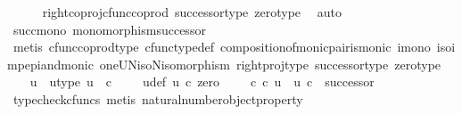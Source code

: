 \begin{isabellebody}
\ \ \ \ \isamarkupfalse%
\ right{\isacharunderscore}{\kern0pt}coproj{\isacharunderscore}{\kern0pt}cfunc{\isacharunderscore}{\kern0pt}coprod\ successor{\isacharunderscore}{\kern0pt}type\ zero{\isacharunderscore}{\kern0pt}type\ \isamarkupfalse%
\ auto\isanewline
\ \ \isamarkupfalse%
\ \isamarkupfalse%
\ succ{\isacharunderscore}{\kern0pt}mono{\isacharcolon}{\kern0pt}\ {\isachardoublequoteopen}monomorphism{\isacharparenleft}{\kern0pt}successor{\isacharparenright}{\kern0pt}{\isachardoublequoteclose}\isanewline
\ \ \ \ \isamarkupfalse%
\ {\isacharparenleft}{\kern0pt}metis\ cfunc{\isacharunderscore}{\kern0pt}coprod{\isacharunderscore}{\kern0pt}type\ cfunc{\isacharunderscore}{\kern0pt}type{\isacharunderscore}{\kern0pt}def\ composition{\isacharunderscore}{\kern0pt}of{\isacharunderscore}{\kern0pt}monic{\isacharunderscore}{\kern0pt}pair{\isacharunderscore}{\kern0pt}is{\isacharunderscore}{\kern0pt}monic\ i{}{\isacharunderscore}{\kern0pt}mono\ iso{\isacharunderscore}{\kern0pt}imp{\isacharunderscore}{\kern0pt}epi{\isacharunderscore}{\kern0pt}and{\isacharunderscore}{\kern0pt}monic\ oneUN{\isacharunderscore}{\kern0pt}iso{\isacharunderscore}{\kern0pt}N{\isacharunderscore}{\kern0pt}isomorphism\ right{\isacharunderscore}{\kern0pt}proj{\isacharunderscore}{\kern0pt}type\ successor{\isacharunderscore}{\kern0pt}type\ zero{\isacharunderscore}{\kern0pt}type{\isacharparenright}{\kern0pt}\isanewline
\ \ \isamarkupfalse%
\ u\ \ u{\isacharunderscore}{\kern0pt}type{\isacharcolon}{\kern0pt}\ {\isachardoublequoteopen}u{\isacharcolon}{\kern0pt}\ \ {\isasymnat}\isactrlsub c\ \ {\isasymrightarrow}\ {\isasymOmega}{\isachardoublequoteclose}\ \ u{\isacharunderscore}{\kern0pt}def{\isacharcolon}{\kern0pt}\ {\isachardoublequoteopen}u\ {\isasymcirc}\isactrlsub c\ zero\ {\isacharequal}{\kern0pt}\ {\isasymt}\ \ {\isasymand}\ {\isacharparenleft}{\kern0pt}{\isasymf}{\isasymcirc}\isactrlsub c{\isasymbeta}\isactrlbsub {\isasymOmega}\isactrlesub {\isacharparenright}{\kern0pt}\ {\isasymcirc}\isactrlsub c\ u\ {\isacharequal}{\kern0pt}\ u\ {\isasymcirc}\isactrlsub c\ \ successor{\isachardoublequoteclose}\isanewline
\ \ \ \ \isamarkupfalse%
\ {\isacharparenleft}{\kern0pt}typecheck{\isacharunderscore}{\kern0pt}cfuncs{\isacharcomma}{\kern0pt}\ metis\ natural{\isacharunderscore}{\kern0pt}number{\isacharunderscore}{\kern0pt}object{\isacharunderscore}{\kern0pt}property{\isacharparenright}{\kern0pt}\ \ \ \ \isanewline
\ \ \isamarkupfalse%

\end{isabellebody}
